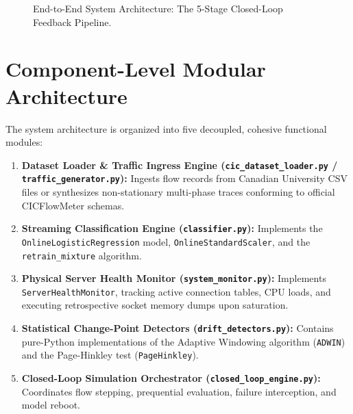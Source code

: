 \documentclass[12pt,a4paper,oneside]{report}
\begin{document}
\begin{figure}[H]
{%
}
\caption{End-to-End System Architecture: The 5-Stage Closed-Loop Feedback Pipeline.}
\label{fig:overall_architecture}
\end{figure}

\section{Component-Level Modular Architecture}
The system architecture is organized into five decoupled, cohesive functional modules:
\begin{enumerate}
    \item \textbf{Dataset Loader \& Traffic Ingress Engine (\texttt{cic\_dataset\_loader.py} / \texttt{traffic\_generator.py}):} Ingests flow records from Canadian University CSV files or synthesizes non-stationary multi-phase traces conforming to official CICFlowMeter schemas.
    \item \textbf{Streaming Classification Engine (\texttt{classifier.py}):} Implements the \texttt{OnlineLogisticRegression} model, \texttt{OnlineStandardScaler}, and the \texttt{retrain\_mixture} algorithm.
    \item \textbf{Physical Server Health Monitor (\texttt{system\_monitor.py}):} Implements \texttt{ServerHealthMonitor}, tracking active connection tables, CPU loads, and executing retrospective socket memory dumps upon saturation.
    \item \textbf{Statistical Change-Point Detectors (\texttt{drift\_detectors.py}):} Contains pure-Python implementations of the Adaptive Windowing algorithm (\texttt{ADWIN}) and the Page-Hinkley test (\texttt{PageHinkley}).
    \item \textbf{Closed-Loop Simulation Orchestrator (\texttt{closed\_loop\_engine.py}):} Coordinates flow stepping, prequential evaluation, failure interception, and model reboot.
\end{enumerate}
\end{document}
